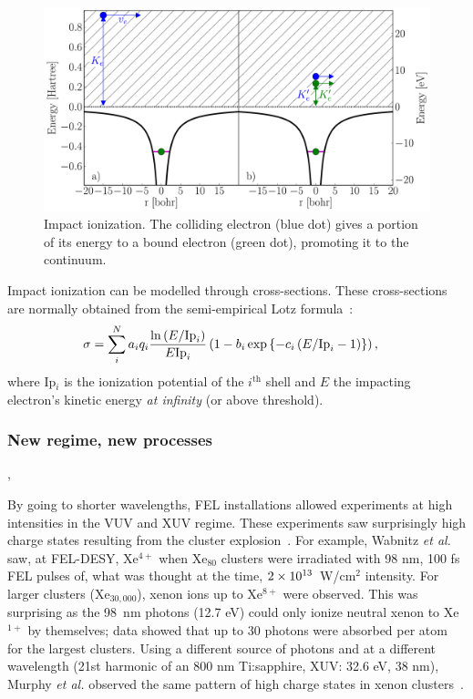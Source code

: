 \begin{figure}
 \centering
 \includegraphics[width=\figurewidth]{figures/ionization_impact}
 \caption{Impact ionization. The colliding electron (blue dot) gives a portion
          of its energy to a bound electron (green dot), promoting it to the
          continuum.}
 \label{fig:ionization:impact}
\end{figure}

Impact ionization can be modelled through cross-sections. These
cross-sections are normally obtained from the semi-empirical Lotz
formula~\cite{Lotz1967}:
\begin{align}
\sigma & = \sum_{i}^{N} a_i q_i \frac{\ln{\left( E/\textrm{Ip}_i \right)}}{E \textrm{Ip}_i} \left( 1 - b_i
\exp{ \left\{ -c_i \left( E/\textrm{Ip}_i - 1 \right) \right\}} \right),
\label{eqn:impact:ionization:lotz}
\end{align}
where Ip$_i$ is the ionization potential of the $i^{\textrm{th}}$ shell and $E$
the impacting electron's kinetic energy \textit{at infinity} (or above threshold).

\subsubsection{New regime, new processes}
\label{section:intro:mechanisms:new},

By going to shorter wavelengths, FEL installations allowed experiments at high
intensities in the VUV and XUV regime. These experiments saw surprisingly
high charge states resulting from the cluster
explosion~\cite{Wabnitz2002,Bostedt2010}. For example, Wabnitz \textit{et al.}
saw, at FEL-DESY, Xe$^{4+}$ when Xe$_{80}$ clusters were irradiated with 98 nm,
100 fs FEL pulses of, what was thought at the time, $\ten{2}{13}$~W/cm$^2$
intensity. For larger clusters (Xe$_{30,000}$), xenon ions up to
Xe$^{8+}$ were observed. This was surprising as the 98~nm
photons (12.7 eV) could only ionize neutral xenon to Xe$^{1+}$ by themselves;
data showed that up to 30 photons were absorbed per atom for the largest
clusters. Using a different source of photons and at a different wavelength
(21st harmonic of an 800 nm Ti:sapphire, XUV: 32.6 eV, 38 nm),
Murphy \textit{et al.} observed the same pattern of high charge states in xenon
clusters~\cite{Murphy2008a,Murphy2008b}.


